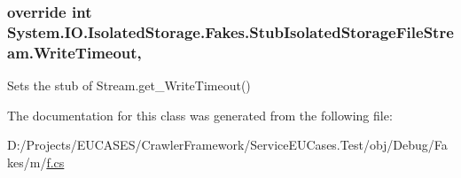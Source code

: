 \hypertarget{class_system_1_1_i_o_1_1_isolated_storage_1_1_fakes_1_1_stub_isolated_storage_file_stream_ad086ecba5e15cf61cf85d4bfe4040c68}{
\subsubsection[{Write\-Timeout}]{\setlength{\rightskip}{0pt plus 5cm}override int System.\-I\-O.\-Isolated\-Storage.\-Fakes.\-Stub\-Isolated\-Storage\-File\-Stream.\-Write\-Timeout\hspace{0.3cm}{\ttfamily [get]}, {\ttfamily [set]}}}\label{class_system_1_1_i_o_1_1_isolated_storage_1_1_fakes_1_1_stub_isolated_storage_file_stream_ad086ecba5e15cf61cf85d4bfe4040c68}


Sets the stub of Stream.\-get\-\_\-\-Write\-Timeout()



The documentation for this class was generated from the following file\-:\begin{DoxyCompactItemize}
\item 
D\-:/\-Projects/\-E\-U\-C\-A\-S\-E\-S/\-Crawler\-Framework/\-Service\-E\-U\-Cases.\-Test/obj/\-Debug/\-Fakes/m/\hyperlink{m_2f_8cs}{f.\-cs}\end{DoxyCompactItemize}
